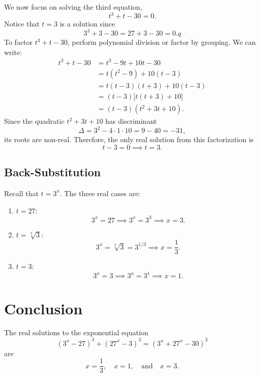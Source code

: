 \documentclass{article}
\begin{document}
We now focus on solving the third equation,
\[
t^3 + t - 30 = 0.
\]
Notice that \(t = 3\) is a solution since
\[
3^3 + 3 - 30 = 27 + 3 - 30 = 0.q
\]
To factor \(t^3 + t - 30\), perform polynomial division or factor by grouping. We can write:
\begin{align*}
t^3 + t - 30 &= t^3 - 9t + 10t - 30 \\
             &= t(t^2 - 9) + 10(t - 3) \\
             &= t(t-3)(t+3) + 10(t-3) \\
             &= (t-3)\bigl[t(t+3) + 10\bigr] \\
             &= (t-3)(t^2+3t+10).
\end{align*}
Since the quadratic \(t^2+3t+10\) has discriminant 
\[
\Delta = 3^2 - 4\cdot 1\cdot 10 = 9 - 40 = -31,
\]
its roots are non-real. Therefore, the only real solution from this factorization is 
\[
t - 3 = 0 \implies t = 3.
\]

\subsection{Back-Substitution}

Recall that \(t = 3^x\). The three real cases are:

\begin{enumerate}
    \item \(t = 27\):
    \[
    3^x = 27 \implies 3^x = 3^3 \implies x = 3.
    \]
    \item \(t = \sqrt[3]{3}\):
    \[
    3^x = \sqrt[3]{3} = 3^{1/3} \implies x = \frac{1}{3}.
    \]
    \item \(t = 3\):
    \[
    3^x = 3 \implies 3^x = 3^1 \implies x = 1.
    \]
\end{enumerate}

\section{Conclusion}

The real solutions to the exponential equation 
\[
(3^x - 27)^3 + (27^x - 3)^3 = (3^x + 27^x - 30)^3
\]
are 
\[
x = \frac{1}{3},\quad x = 1,\quad \text{and} \quad x = 3.
\]
\end{document}
